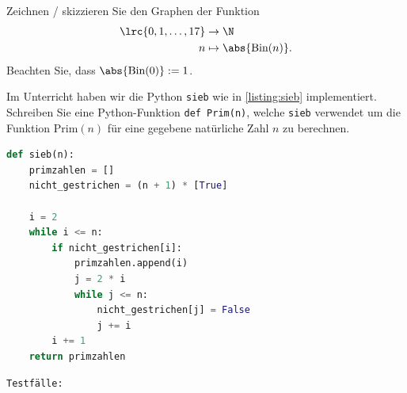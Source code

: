 \begin{questions}
	\question[2]
	Zeichnen / skizzieren Sie den Graphen der Funktion
	\begin{align*}
		\lrc{0, 1, \ldots, 17} & \to\N                       \\
		n                      & \mapsto\abs{\text{Bin}(n)}.
	\end{align*}
	Beachten Sie, dass $\abs{\text{Bin}(0)} := 1$.

	\begin{solution}
		\begin{figure}[H]
		\end{figure}
	\end{solution}

	\question[2] Im Unterricht haben wir die Python \lstinline|sieb| wie in \cref{listing:sieb} implementiert.
	Schreiben Sie eine Python-Funktion \lstinline|def Prim(n)|, welche \lstinline|sieb| verwendet um die Funktion $\text{Prim}(n)$ für eine gegebene natürliche Zahl $n$ zu berechnen.

	\begin{lstlisting}[language=Python,caption=Sieb des Eratosthenes,numbers=none,label=listing:sieb]
def sieb(n):
    primzahlen = []
    nicht_gestrichen = (n + 1) * [True]

    i = 2
    while i <= n:
        if nicht_gestrichen[i]:
            primzahlen.append(i)
            j = 2 * i
            while j <= n:
                nicht_gestrichen[j] = False
                j += i
        i += 1
    return primzahlen
\end{lstlisting}

	\begin{lstlisting}[numbers=none]
  Testfälle:


\end{lstlisting}
\end{questions}
